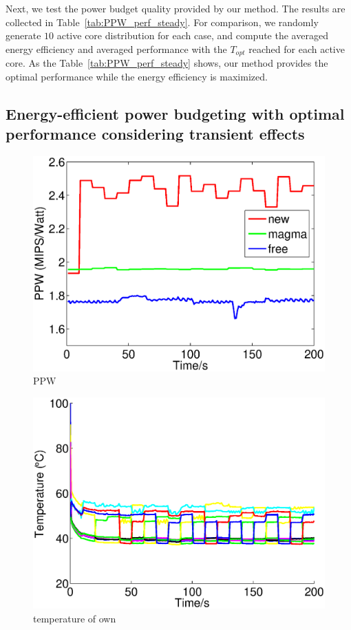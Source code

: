 Next, we test the power budget quality provided by our method. The results are collected in Table~\ref{tab:PPW_perf_steady}. For comparison, we randomly generate $10$ active core distribution for each case, and compute the averaged energy efficiency and averaged performance with the $T_{opt}$ reached for each active core. As the Table~\ref{tab:PPW_perf_steady} shows, our method provides the optimal performance while the energy efficiency is maximized.


\subsection{Energy-efficient power budgeting with optimal performance considering transient effects}

\begin{figure}
\centering
\includegraphics[width=1\linewidth]{fig/PPW.eps}
\caption{PPW}
\end{figure}

\begin{figure}
\centering
\includegraphics[width=1\linewidth]{fig/tem_own.eps}
\caption{temperature of own}
\end{figure}

